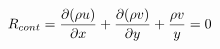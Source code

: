 \documentclass[preview]{standalone}
\begin{document}
\begin{align*}
\special{dvisvgm:raw <g id='unique000'>}R_{cont} = \frac{\partial (\rho u)}{\partial x} + \frac{\partial (\rho v)}{\partial y} + \frac{\rho v}{y} = 0\special{dvisvgm:raw </g>}
\end{align*}
\end{document}
